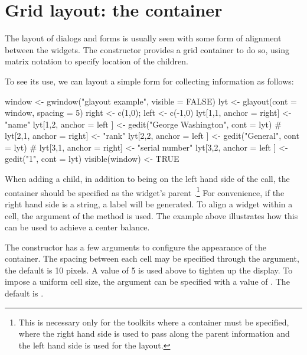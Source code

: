 


\section{Grid layout: the  container}
\label{sec:gWidgets-glayout-container}

The layout of dialogs and forms is usually seen with some form of
alignment between the widgets. The  constructor
provides a grid container to do so, using matrix notation to specify
location of the children.  

To see its use, we can layout a simple form for collecting information
as follows:

\begin{Schunk}
\begin{Sinput}
 window <- gwindow("glayout example", visible = FALSE)
 lyt <- glayout(cont = window, spacing = 5)
 right <- c(1,0); left <- c(-1,0)
 lyt[1,1, anchor = right] <- "name"
 lyt[1,2, anchor = left ] <- gedit("George Washington", 
            cont = lyt)
 #
 lyt[2,1, anchor = right] <- "rank"
 lyt[2,2, anchor = left ] <- gedit("General", cont = lyt)
 #
 lyt[3,1, anchor = right] <- "serial number"
 lyt[3,2, anchor = left ] <- gedit("1", cont = lyt)
 visible(window) <- TRUE
\end{Sinput}
\end{Schunk}
%

When adding a child, in addition to being on the left hand side of the
\code{[\ASSIGN} call, the  container should be specified
as the widget's parent .\footnote{This is necessary
  only for the toolkits where a container must be specified, where the
  right hand side is used to pass along the parent information and the
  left hand side is used for the layout.} For convenience, if the
right hand side is a string, a label will be generated.  To align a
widget within a cell, the  argument of the
\code{[\ASSIGN}{glayout} method is used. The example above illustrates
how this can be used to achieve a center balance.

The constructor has a few arguments to configure the appearance of the
container. The spacing between each cell may be specified through the
 argument, the default is 10 pixels. A
value of 5 is used above to tighten up the display.
To impose a uniform cell size, the 
argument can be specified with a value of . The default is
. 


